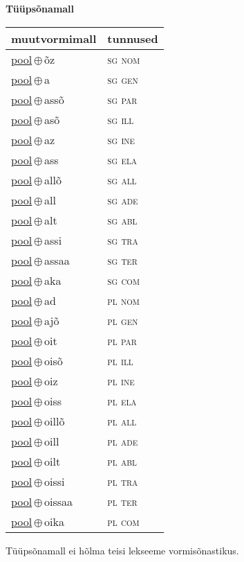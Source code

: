

\vspace{3.5em}
\noindent \begin{minipage}{\textwidth}
\noindent \textbf{Tüüpsõnamall \,}\\

\begin{sideways}
\begin{tabular}{l l}
muutvormimall & tunnused \\
\hline
\underline{pool}\,$\oplus$\,õz & \textsc{ sg nom } \\
\underline{pool}\,$\oplus$\,a & \textsc{ sg gen } \\
\underline{pool}\,$\oplus$\,assõ & \textsc{ sg par } \\
\underline{pool}\,$\oplus$\,asõ & \textsc{ sg ill } \\
\underline{pool}\,$\oplus$\,az & \textsc{ sg ine } \\
\underline{pool}\,$\oplus$\,ass & \textsc{ sg ela } \\
\underline{pool}\,$\oplus$\,allõ & \textsc{ sg all } \\
\underline{pool}\,$\oplus$\,all & \textsc{ sg ade } \\
\underline{pool}\,$\oplus$\,alt & \textsc{ sg abl } \\
\underline{pool}\,$\oplus$\,assi & \textsc{ sg tra } \\
\underline{pool}\,$\oplus$\,assaa & \textsc{ sg ter } \\
\underline{pool}\,$\oplus$\,aka & \textsc{ sg com } \\
\underline{pool}\,$\oplus$\,ad & \textsc{ pl nom } \\
\underline{pool}\,$\oplus$\,ajõ & \textsc{ pl gen } \\
\underline{pool}\,$\oplus$\,oit & \textsc{ pl par } \\
\underline{pool}\,$\oplus$\,oisõ & \textsc{ pl ill } \\
\underline{pool}\,$\oplus$\,oiz & \textsc{ pl ine } \\
\underline{pool}\,$\oplus$\,oiss & \textsc{ pl ela } \\
\underline{pool}\,$\oplus$\,oillõ & \textsc{ pl all } \\
\underline{pool}\,$\oplus$\,oill & \textsc{ pl ade } \\
\underline{pool}\,$\oplus$\,oilt & \textsc{ pl abl } \\
\underline{pool}\,$\oplus$\,oissi & \textsc{ pl tra } \\
\underline{pool}\,$\oplus$\,oissaa & \textsc{ pl ter } \\
\underline{pool}\,$\oplus$\,oika & \textsc{ pl com } \\
\end{tabular}
\end{sideways}
\label{tab:tüüpsõnamall-poolõz}

\end{minipage}

 
\vspace{1em}
\noindent Tüüpsõnamall  ei hõlma teisi lekseeme vormi\-sõnastikus.
